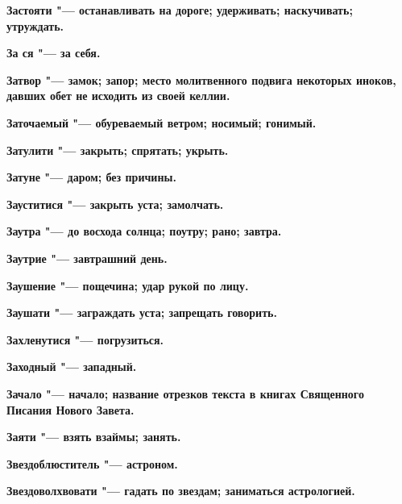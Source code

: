 \begin{mymulticols}{2}
\bfseries Застояти\normalfont{} "--- останавливать на дороге; удерживать; наскучивать; утруждать. 




\bfseries За ся\normalfont{} "--- за себя. 




\bfseries Затвор\normalfont{} "--- замок; запор; место молитвенного подвига некоторых иноков, давших обет не исходить из своей келлии. 




\bfseries Заточаемый\normalfont{} "--- обуреваемый ветром; носимый; гонимый. 




\bfseries Затулити\normalfont{} "--- закрыть; спрятать; укрыть. 




\bfseries Затуне\normalfont{} "--- даром; без причины. 




\bfseries Зауститися\normalfont{} "--- закрыть уста; замолчать. 




\bfseries Заутра\normalfont{} "--- до восхода солнца; поутру; рано; завтра. 




\bfseries Заутрие\normalfont{} "--- завтрашний день. 




\bfseries Заушение\normalfont{} "--- пощечина; удар рукой по лицу. 




\bfseries Заушати\normalfont{} "--- заграждать уста; запрещать говорить. 




\bfseries Захленутися\normalfont{} "--- погрузиться. 




\bfseries Заходный\normalfont{} "--- западный. 




\bfseries Зачало\normalfont{} "--- начало; название отрезков текста в книгах Священного Писания Нового Завета. 




\bfseries Заяти\normalfont{} "--- взять взаймы; занять. 




\bfseries Звездоблюститель\normalfont{} "--- астроном. 




\bfseries Звездоволхвовати\normalfont{} "--- гадать по звездам; заниматься астрологией. 





\end{mymulticols}
